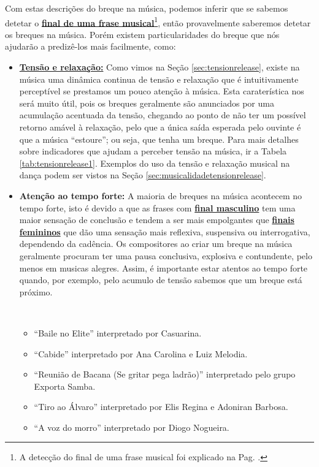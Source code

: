 Com estas descrições do breque na música, 
podemos inferir que se sabemos detetar o 
\hyperref[pos:detetandofinalfrase]{\textbf{final de uma frase musical}}\footnote{A
detecção do final de uma frase musical foi explicado na Pag. \pageref{pos:detetandofinalfrase}.},
então provavelmente saberemos detetar os breques na música.
Porém existem particularidades do breque
que nós ajudarão a predizê-los mais facilmente, como:
\begin{itemize}
\item \hyperref[sec:tensionrelease]{\textbf{Tensão e relaxação:}} Como vimos na Seção \ref{sec:tensionrelease},
existe na música uma dinâmica continua de tensão e relaxação 
que é intuitivamente perceptível se prestamos um pouco atenção à música.
Esta caraterística nos será muito útil, 
pois os breques geralmente são anunciados por uma acumulação acentuada da tensão,
chegando ao ponto de não ter um possível retorno amável à relaxação, 
pelo que a única saída esperada pelo ouvinte é que a música ``estoure'';
ou seja, que tenha um breque.
Para mais detalhes sobre indicadores que ajudam a perceber tensão na música, ir a Tabela \ref{tab:tensionrelease1}.
Exemplos do uso da tensão e relaxação musical na dança podem ser vistos na Seção \ref{sec:musicalidadetensionrelease}.
\item \textbf{Atenção ao tempo forte:} A maioria de breques na música acontecem no tempo forte,
isto é devido a que as frases com \hyperref[subsubsec:finalmasculino]{\textbf{final masculino}} 
tem uma maior sensação de conclusão e tendem a ser mais empolgantes que 
\hyperref[subsubsec:finalfemenino]{\textbf{finais femininos}} que dão uma sensação mais reflexiva, 
suspensiva ou interrogativa, dependendo da cadência.
Os compositores ao criar um breque na música geralmente procuram ter uma pausa conclusiva, explosiva e contundente,
pelo menos em musicas alegres.
Assim, é importante estar atentos ao tempo forte quando, por exemplo, 
pelo acumulo de tensão sabemos que um breque está próximo.
\begin{example}~
\label{ex:breakmasculinos}
\begin{itemize}
\item ``Baile no Elite'' interpretado por Casuarina.
\item ``Cabide'' interpretado por Ana Carolina e Luiz Melodia.
\item ``Reunião de Bacana (Se gritar pega ladrão)'' interpretado pelo grupo Exporta Samba.
\item ``Tiro ao Álvaro'' interpretado por Elis Regina e Adoniran Barbosa. 
\item ``A voz do morro'' interpretado por Diogo Nogueira.
\end{itemize}
\end{example}


\end{itemize}

